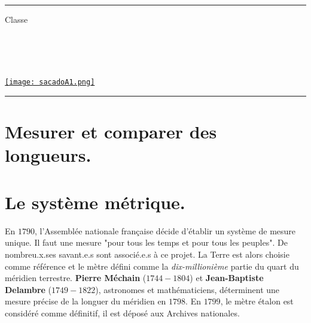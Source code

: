 \documentclass[a4paper,dvipsnames]{article}
\begin{document}

\fancyhead[C]{}
\hrule \medskip %
\begin{minipage}{0.295\textwidth} 
\raggedright
Classe \myClasse \hfill\\
\myDiscipline \hfill\\
\myParcours \hfill\\
\end{minipage}
\begin{minipage}{0.4\textwidth} 
\centering 
\large 
\myTitle \\ 
\end{minipage}
\begin{minipage}{0.295\textwidth} 
\raggedleft
\href{https://sacado.xyz/}{\texttt{[image: sacadoA1.png]}}
\end{minipage}
\medskip\hrule 


\section{Mesurer et comparer des longueurs.}

\section{Le système métrique.}

\begin{His}
En $1790$, l'Assemblée nationale française décide d'établir un système de mesure unique. Il faut une mesure "pour tous les temps et pour tous les peuples". De nombreu.x.ses savant.e.s sont associé.e.s à ce projet. La Terre est alors choisie comme référence et le mètre défini comme la \textit{dix-millionième} partie du quart du méridien terrestre. \textbf{Pierre Méchain} ($1744-1804$) et \textbf{Jean-Baptiste Delambre} ($1749-1822$), astronomes et mathématiciens, déterminent une mesure précise de la longuer du méridien en $1798$. En $1799$, le mètre étalon est considéré comme définitif, il est déposé aux Archives nationales.
\end{His}
\end{document}
